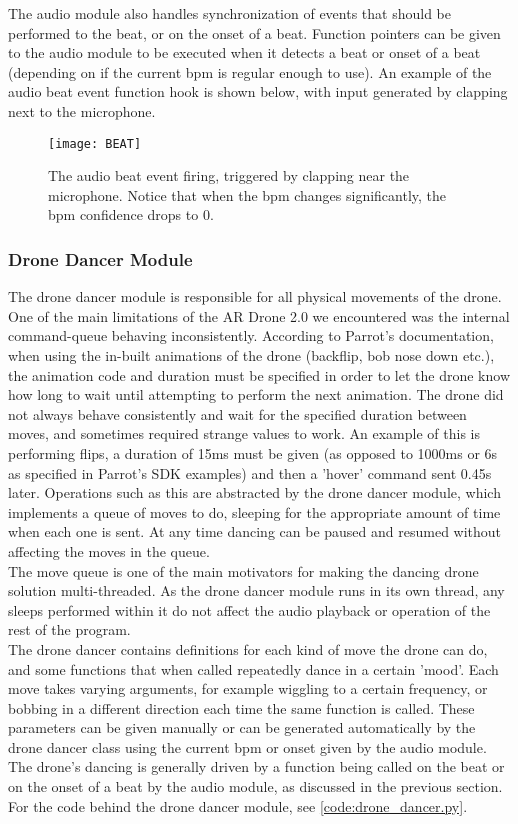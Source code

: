 The audio module also handles synchronization of events that should be performed to the beat, or on the onset of
a beat. Function pointers can be given to the audio module to be executed when it detects a beat or onset of a
beat (depending on if the current bpm is regular enough to use). An example of the audio beat event function hook
is shown below, with input generated by clapping next to the microphone.\\

\begin{figure}[h]
    \centering
    \texttt{[image: BEAT]}
    \caption{The audio beat event firing, triggered by clapping near the microphone. Notice that when the bpm
    changes significantly, the bpm confidence drops to 0.}
\end{figure}

\subsubsection{Drone Dancer Module}
The drone dancer module is responsible for all physical movements of the drone. One of the main limitations of
the AR Drone 2.0 we encountered was the internal command-queue behaving inconsistently. According to Parrot's
documentation, when using the in-built animations of the drone (backflip, bob nose down etc.), the animation code
and duration must be specified in order to let the drone know how long to wait until attempting to perform the
next animation. The drone did not always behave consistently and wait for the specified duration between moves,
and sometimes required strange values to work. An example of this is performing flips, a duration of 15ms must be
given (as opposed to 1000ms or 6s as specified in Parrot's SDK examples) and then a 'hover' command sent 0.45s
later. Operations such as this are abstracted by the drone dancer module, which implements a queue of moves to
do, sleeping for the appropriate amount of time when each one is sent. At any time dancing can be paused and
resumed without affecting the moves in the queue.\\

The move queue is one of the main motivators for making the dancing drone solution multi-threaded. As the drone
dancer module runs in its own thread, any sleeps performed within it do not affect the audio playback or
operation of the rest of the program.\\

The drone dancer contains definitions for each kind of move the drone can do, and some functions that when called
repeatedly dance in a certain 'mood'. Each move takes varying arguments, for example wiggling to a certain
frequency, or bobbing in a different direction each time the same function is called. These parameters can be
given manually or can be generated automatically by the drone dancer class using the current bpm or onset given by the
audio module. The drone's dancing is generally driven by a function being called on the beat or on the onset of a
beat by the audio module, as discussed in the previous section. For the code behind the drone dancer module, see
\eqref{code:drone_dancer.py}.\\

